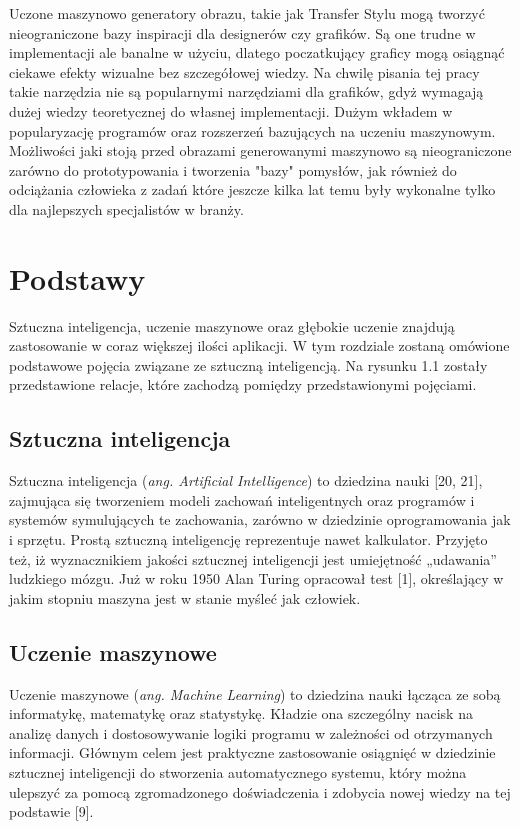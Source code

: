 \documentclass[brudnopis]{xmgr}
\begin{document}
 Uczone maszynowo generatory obrazu, takie jak Transfer Stylu mogą tworzyć nieograniczone bazy inspiracji dla designerów czy grafików. Są one trudne w implementacji ale banalne w użyciu, dlatego poczatkujący graficy mogą osiągnąć ciekawe efekty wizualne bez szczegółowej wiedzy. Na chwilę pisania tej pracy takie narzędzia nie są popularnymi narzędziami dla grafików, gdyż wymagają dużej wiedzy teoretycznej do własnej implementacji. Dużym wkładem w popularyzację programów oraz rozszerzeń bazujących na uczeniu maszynowym. Możliwości jaki stoją przed obrazami generowanymi maszynowo są nieograniczone zarówno do prototypowania i tworzenia "bazy" pomysłów, jak również do odciążania człowieka z zadań które jeszcze kilka lat temu były wykonalne tylko dla najlepszych specjalistów w branży.


\chapter{Podstawy\label{s:dtd}}

Sztuczna inteligencja, uczenie maszynowe oraz głębokie uczenie znajdują zastosowanie w coraz większej ilości aplikacji. W tym rozdziale zostaną omówione podstawowe pojęcia związane ze sztuczną inteligencją. Na rysunku 1.1 zostały przedstawione relacje, które zachodzą pomiędzy przedstawionymi pojęciami.

\section{Sztuczna inteligencja}

Sztuczna inteligencja (\textit{ang. Artificial Intelligence}) to dziedzina nauki [20, 21], zajmująca się tworzeniem modeli zachowań inteligentnych oraz programów i systemów symulujących te zachowania, zarówno w dziedzinie oprogramowania jak i sprzętu. Prostą sztuczną inteligencję reprezentuje nawet kalkulator. Przyjęto też, iż wyznacznikiem jakości sztucznej inteligencji jest umiejętność „udawania” ludzkiego mózgu. Już w roku 1950 Alan Turing opracował test [1], określający w jakim stopniu maszyna jest w stanie myśleć jak człowiek.



\section{Uczenie maszynowe}

Uczenie maszynowe (\textit{ang. Machine Learning}) to dziedzina nauki łącząca ze sobą informatykę, matematykę oraz statystykę. Kładzie ona szczególny nacisk na analizę danych i dostosowywanie logiki programu w zależności od otrzymanych informacji. Głównym celem jest praktyczne zastosowanie osiągnięć w dziedzinie sztucznej inteligencji do stworzenia automatycznego systemu, który można ulepszyć za pomocą zgromadzonego doświadczenia i zdobycia nowej wiedzy na tej podstawie [9].
\end{document}
